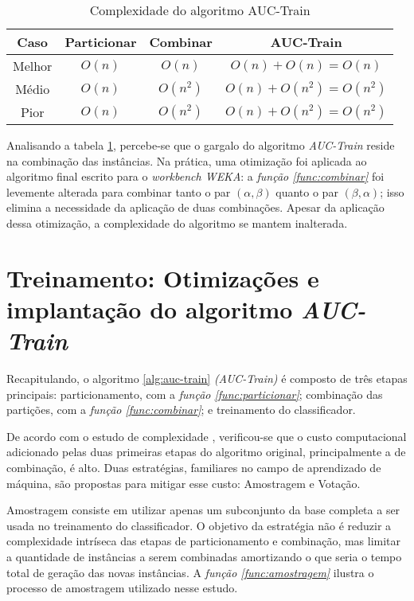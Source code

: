 \begin{table}[h!]
    \centering
    \begin{tabular}{ c | c c | c }
        \hline

        Caso & Particionar & Combinar & AUC-Train \\

        \hline

        Melhor & $O(n)$ & $O(n)$ & $O(n) + O(n) = O(n)$ \\
        Médio & $O(n)$ & $O(n^2)$ & $O(n) + O(n^2) = O(n^2)$ \\
        Pior  & $O(n)$ & $O(n^2)$ & $O(n) + O(n^2) = O(n^2)$ \\

        \hline
    \end{tabular}

    \caption{Complexidade do algoritmo AUC-Train}
    \label{auc-train-complexity}
\end{table}

Analisando a tabela \ref{auc-train-complexity}, percebe-se que o gargalo do algoritmo \emph{AUC-Train} reside na combinação das instâncias. Na prática, uma otimização foi aplicada ao algoritmo final escrito para o \emph{workbench WEKA}: a \emph{função \ref{func:combinar}} foi levemente alterada para combinar tanto o par $(\alpha, \beta)$ quanto o par $(\beta, \alpha)$; isso elimina a necessidade da aplicação de duas combinações. Apesar da aplicação dessa otimização, a complexidade do algoritmo se mantem inalterada.


\section{Treinamento: Otimizações e implantação do algoritmo \emph{AUC-Train}}

Recapitulando, o algoritmo \ref{alg:auc-train} \emph{(AUC-Train)} é composto de três etapas principais: particionamento, com a \emph{função \ref{func:particionar}}; combinação das partições, com a \emph{função \ref{func:combinar}}; e treinamento do classificador.

De acordo com o estudo de complexidade , verificou-se que o custo computacional adicionado pelas duas primeiras etapas do algoritmo  original, principalmente a de combinação, é alto. Duas estratégias, familiares no campo de aprendizado de máquina, são propostas para mitigar esse custo: Amostragem e Votação.

Amostragem consiste em utilizar apenas um subconjunto da base completa a ser usada no treinamento do classificador. O objetivo da estratégia não é reduzir a complexidade intríseca das etapas de particionamento e combinação, mas limitar a quantidade de instâncias a serem combinadas amortizando o que seria o tempo total de geração das novas instâncias. A \emph{função \ref{func:amostragem}} ilustra o processo de amostragem utilizado nesse estudo.

